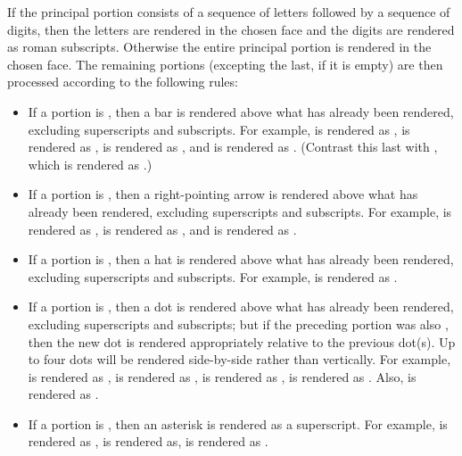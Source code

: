 If the principal portion consists of a sequence of letters followed by a sequence
of digits, then the letters are rendered in the chosen face and
the digits are rendered as roman subscripts.  Otherwise the
entire principal portion is rendered in the chosen face.
The remaining portions (excepting the last, if it is empty)
are then processed according to the following rules:
\begin{itemize}
\item If a portion is , then a bar is rendered
above what has already been rendered, excluding superscripts and subscripts.
For example,  is rendered as ,
 is rendered as ,
 is rendered as ,
and  is rendered as .
(Contrast this last with , which is rendered as .)

\item If a portion is , then a right-pointing arrow is rendered
above what has already been rendered, excluding superscripts and subscripts.
For example,  is rendered as ,
 is rendered as , and
 is rendered as .

\item If a portion is , then a hat is rendered above what has already
been rendered, excluding superscripts and subscripts.  For example,
 is rendered as .

\item If a portion is , then a dot is rendered above what has already
been rendered, excluding superscripts and subscripts; but if the preceding portion was also ,
then the new dot is rendered appropriately relative to the previous dot(s).
Up to four dots will be rendered side-by-side rather than vertically.
For example,
 is rendered as ,
 is rendered as ,
 is rendered as ,
 is rendered as .
Also,  is rendered as .

\item If a portion is , then an asterisk \STR{*} is rendered as a superscript.
For example,
 is rendered as ,
 is rendered as,
 is rendered as .


\end{itemize}
